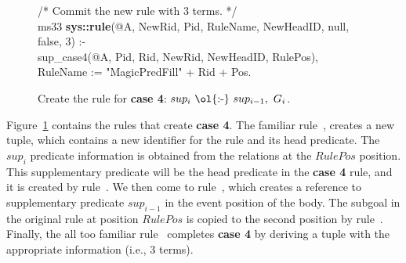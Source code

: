 \begin{figure}[!t]
\begin{boxedminipage}{\linewidth}
/* Commit the new rule with $3$ terms. */ \\
ms33 {\bf sys::rule}(@A, NewRid, Pid, RuleName, NewHeadID, null, false, 3) :- \\
\datalogspace sup\_case4(@A, Pid, Rid, NewRid, NewHeadID, RulePos), \\
\datalogspace RuleName := "MagicPredFill" + Rid + Pos.

\end{boxedminipage}
\caption{\label{ch:magic:fig:rewrite7} 
Create the rule for {\bf case 4}: $sup_i\ \text{\ol{:-}}\ sup_{i-1},\ G_i$. } 
\end{figure}

Figure~\ref{ch:magic:fig:rewrite7} contains the rules that create {\bf case 4}.
The familiar rule~, creates a new  tuple, which
contains a new identifier for the rule and its head predicate.  The $sup_i$
predicate information is obtained from the  relations at the $RulePos$
position.  This supplementary predicate will be the head predicate in the {\bf
case 4} rule, and it is created by rule~.  We then come to
rule~, which creates a reference to supplementary predicate
$sup_{i-1}$ in the event position of the body.  The subgoal in the original
rule at position $RulePos$ is copied to the second position by rule~.
Finally, the all too familiar rule~ completes {\bf case 4} by deriving
a  tuple with the appropriate information (i.e., $3$ terms).


